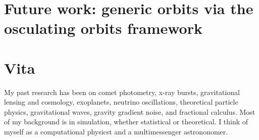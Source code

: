 \documentclass[12pt,letterpaper]{lsuetd}
\begin{document}
\chapter{Future work: generic orbits via the osculating orbits framework}
\doublespacing

\label{futurework}
\pagebreak
\singlespacing
\begin{thebibliography}{999}
\vspace{0.9em}

\end{thebibliography}
%
%

\chapter*{Vita}
\doublespacing
\setlength{\parindent}{1.75em}
\vspace{0.2em}
My past research has been on comet photometry, x-ray bursts, gravitational lensing and cosmology, exoplanets, neutrino oscillations, theoretical particle physics, gravitational waves, gravity gradient noise, and fractional calculus. Most of my background is in simulation, whether statistical or theoretical. I think of myself as a computational physicst and a multimessenger astrononomer. 
\end{document}
